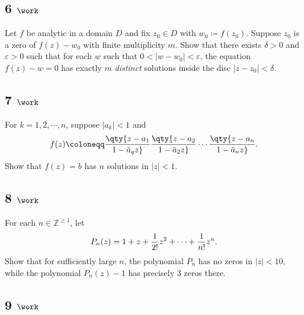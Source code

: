\hypertarget{work-65}{%
\subsection{\texorpdfstring{6
\(\work\)}{6 \textbackslash work}}\label{work-65}}

Let \(f\) be analytic in a domain \(D\) and fix \(z_0 \in D\) with
\(w_0 \coloneqq f(z_0)\). Suppose \(z_0\) is a zero of \(f(z) - w_0\)
with finite multiplicity \(m\). Show that there exists \(\delta >0\) and
\({\varepsilon}> 0\) such that for each \(w\) such that
\(0 < {\left\lvert {w-w_0} \right\rvert} < {\varepsilon}\), the equation
\(f(z) - w = 0\) has exactly \(m\) \emph{distinct} solutions inside the
disc \({\left\lvert {z-z_0} \right\rvert} < \delta\).

\hypertarget{work-66}{%
\subsection{\texorpdfstring{7
\(\work\)}{7 \textbackslash work}}\label{work-66}}

For \(k=1,2,\cdots, n\), suppose
\({\left\lvert {a_k} \right\rvert} < 1\) and
\begin{align*}
f(z) \coloneqq\qty{z - a_1 \over 1 - \mkern 1.5mu\overline{\mkern-1.5mua\mkern-1.5mu}\mkern 1.5mu_q z} \qty{z-a_2 \over 1 - \mkern 1.5mu\overline{\mkern-1.5mua\mkern-1.5mu}\mkern 1.5mu_2 z} \cdots \qty{z - a_n \over 1 - \mkern 1.5mu\overline{\mkern-1.5mua\mkern-1.5mu}\mkern 1.5mu_n z}
.\end{align*}
Show that \(f(z) = b\) has \(n\) solutions in
\({\left\lvert {z} \right\rvert} < 1\).

\hypertarget{work-67}{%
\subsection{\texorpdfstring{8
\(\work\)}{8 \textbackslash work}}\label{work-67}}

For each \(n\in {\mathbb{Z}}^{\geq 1}\), let
\begin{align*}
P_n(z) = 1 + z + {1\over 2!} z^2 + \cdots + {1\over n!}z^n
.\end{align*}
Show that for sufficiently large \(n\), the polynomial \(P_n\) has no
zeros in \({\left\lvert {z} \right\rvert} < 10\), while the polynomial
\(P_n(z) - 1\) has precisely 3 zeros there.

\hypertarget{work-68}{%
\subsection{\texorpdfstring{9
\(\work\)}{9 \textbackslash work}}\label{work-68}}

